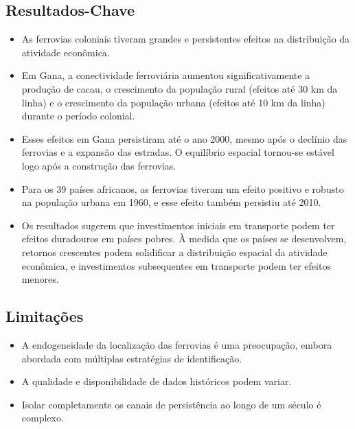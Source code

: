 \documentclass[12pt]{article}
\begin{document}
\subsection*{Resultados-Chave}
\begin{itemize}
    \item As ferrovias coloniais tiveram grandes e persistentes efeitos na distribuição da atividade econômica.
    \item Em Gana, a conectividade ferroviária aumentou significativamente a produção de cacau, o crescimento da população rural (efeitos até 30 km da linha) e o crescimento da população urbana (efeitos até 10 km da linha) durante o período colonial.
    \item Esses efeitos em Gana persistiram até o ano 2000, mesmo após o declínio das ferrovias e a expansão das estradas. O equilíbrio espacial tornou-se estável logo após a construção das ferrovias.
    \item Para os 39 países africanos, as ferrovias tiveram um efeito positivo e robusto na população urbana em 1960, e esse efeito também persistiu até 2010.
    \item Os resultados sugerem que investimentos iniciais em transporte podem ter efeitos duradouros em países pobres. À medida que os países se desenvolvem, retornos crescentes podem solidificar a distribuição espacial da atividade econômica, e investimentos subsequentes em transporte podem ter efeitos menores.
\end{itemize}

\subsection*{Limitações}
\begin{itemize}
    \item A endogeneidade da localização das ferrovias é uma preocupação, embora abordada com múltiplas estratégias de identificação.
    \item A qualidade e disponibilidade de dados históricos podem variar.
    \item Isolar completamente os canais de persistência ao longo de um século é complexo.
\end{itemize}
\end{document}
